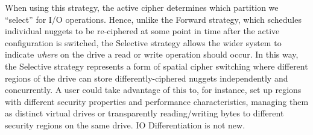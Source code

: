 When using this strategy, the active cipher determines which partition we
``select'' for I/O operations. Hence, unlike the Forward strategy, which
schedules individual nuggets to be re-ciphered at some point in time after the
active configuration is switched, the Selective strategy allows the wider system
to indicate \emph{where} on the drive a read or write operation should occur. In
this way, the Selective strategy represents a form of spatial cipher switching
where different regions of the drive can store differently-ciphered nuggets
independently and concurrently. A user could take advantage of this to, for
instance, set up regions with different security properties and performance
characteristics, managing them as distinct virtual drives or transparently
reading/writing bytes to different security regions on the same drive. IO
Differentiation is not new.
